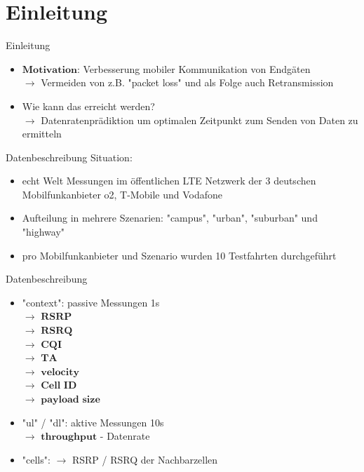 \section{Einleitung}

\begin{frame}{Einleitung}
	\begin{itemize}
		\item $\textbf{Motivation}$: Verbesserung mobiler Kommunikation von Endgäten \\
		$\rightarrow$ Vermeiden von z.B. "packet loss" und als Folge auch Retransmission
		\item Wie kann das erreicht werden? \\
		$\rightarrow$ Datenratenprädiktion um optimalen Zeitpunkt zum Senden von Daten zu ermitteln
    \end{itemize}
\end{frame}


\begin{frame}{Datenbeschreibung}
Situation:
	\begin{itemize}
		\item echt Welt Messungen im öffentlichen LTE Netzwerk der 3 deutschen Mobilfunkanbieter o2, T-Mobile und Vodafone
		\item Aufteilung in mehrere Szenarien: "campus", "urban", "suburban" und "highway"
		\item pro Mobilfunkanbieter und Szenario wurden 10 Testfahrten durchgeführt
	\end{itemize}
\end{frame}


\begin{frame}{Datenbeschreibung}
	\begin{itemize}
		\item "context": passive Messungen 1s\\
		$\rightarrow$ $\textbf{RSRP}$ \\
		$\rightarrow$ $\textbf{RSRQ}$ \\
		$\rightarrow$ $\textbf{CQI}$ \\
		$\rightarrow$ $\textbf{TA}$ \\
		$\rightarrow$ $\textbf{velocity}$ \\
		$\rightarrow$ $\textbf{Cell ID}$  \\
		$\rightarrow$ $\textbf{payload size}$ \\
		\item "ul" / "dl": aktive Messungen 10s \\
		$\rightarrow$ $\textbf{throughput}$ - Datenrate \\
		\item "cells":
		$\rightarrow$ RSRP / RSRQ der Nachbarzellen
	\end{itemize}
\end{frame}



